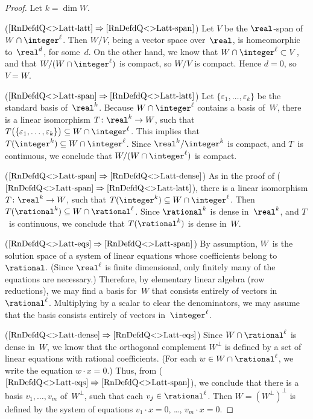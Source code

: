 \begin{proof}
Let $k = \dim W$.

($\ref{RnDefdQ<>Latt-latt} \Rightarrow
\ref{RnDefdQ<>Latt-span}$) Let $V$ be the $\real$-span of $W
\cap \integer^\ell$. Then $W/V$, being a vector space
over~$\real$, is homeomorphic to~$\real^d$, for some~$d$. On
the other hand, we know that $W \cap \integer^\ell \subset
V$, and that $W/(W \cap \integer^\ell)$ is compact, so $W/V$
is compact. Hence $d = 0$, so $V = W$.

($\ref{RnDefdQ<>Latt-span} \Rightarrow \ref{RnDefdQ<>Latt-latt}$) 
Let $\{\varepsilon_1,\ldots,\varepsilon_k\}$ be the standard
basis of~$\real^k$. 
Because $W \cap \integer^\ell$ contains a basis of~$W$, there is a
linear isomorphism $T \colon \real^k \to W$, such that
$T\bigl( \{\varepsilon_1,\ldots,\varepsilon_k\} \bigr) \subseteq W \cap \integer^\ell$. This implies that $T(\integer^k) \subseteq W \cap
\integer^\ell$. Since $\real^k/\integer^k$ is compact, and $T$~is continuous, we
conclude that $W/(W \cap \integer^\ell)$ is compact.

 ($\ref{RnDefdQ<>Latt-span} \Rightarrow \ref{RnDefdQ<>Latt-dense}$) 
 As in the proof of ($\ref{RnDefdQ<>Latt-span} \Rightarrow \ref{RnDefdQ<>Latt-latt}$), 
there is a linear isomorphism $T \colon \real^k \to W$, such that
$T(\integer^k) \subseteq W \cap \integer^\ell$. 
Then $T(\rational^k) \subseteq W \cap
\rational^\ell$. Since $\rational^k$ is dense in~$\real^k$,
and $T$~is continuous, we conclude that $T(\rational^k)$ is
dense in~$W$.

 ($\ref{RnDefdQ<>Latt-eqs} \Rightarrow
\ref{RnDefdQ<>Latt-span}$) By assumption, $W$~is the
solution space of a system of linear equations whose
coefficients belong to~$\rational$. (Since $\real^\ell$ is 
finite dimensional, only finitely many of the equations are 
necessary.) Therefore, by elementary linear algebra (row 
reductions), we may find a basis for~$W$ that
consists entirely of vectors in~$\rational^\ell$.
Multiplying by a scalar to clear the denominators, we may
assume that the basis consists entirely of vectors
in~$\integer^\ell$.

 ($\ref{RnDefdQ<>Latt-dense} \Rightarrow
\ref{RnDefdQ<>Latt-eqs}$) 
Since $W \cap \rational^\ell$ is
dense in~$W$, we know that the orthogonal complement $W^\perp$ is defined by a set
of linear equations with rational coefficients. (For each 
$w \in W \cap \rational^\ell$, we write the equation 
$w \cdot x = 0$.) Thus, from 
($\ref{RnDefdQ<>Latt-eqs} \Rightarrow
\ref{RnDefdQ<>Latt-span}$), we conclude that there is a
basis $v_1,\ldots,v_m$ of~$W^\perp$, such that each $v_j \in
\rational^\ell$. Then $W = (W^\perp)^\perp$ is defined by the
system of equations $v_1 \cdot x= 0$, \dots, $v_m \cdot x =
0$.
 \end{proof}

